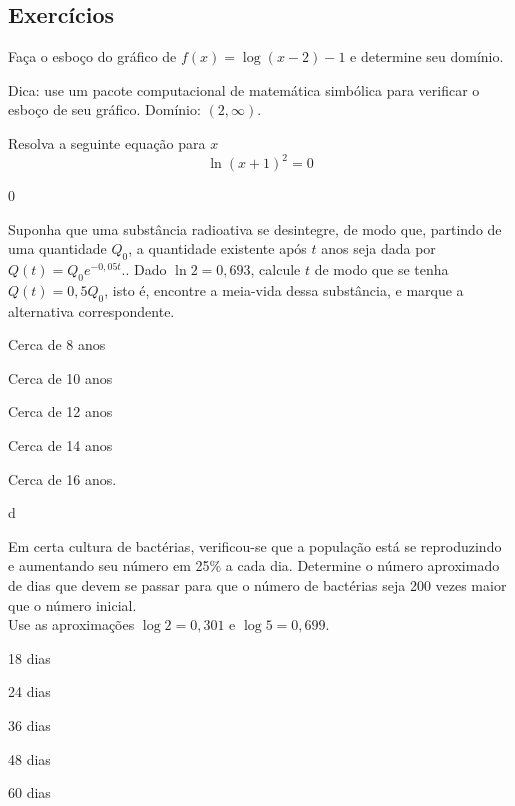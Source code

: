 \documentclass[../main.tex]{subfiles}
\begin{document}
\subsection{Exercícios}

\begin{exer}
  Faça o esboço do gráfico de $f(x) = \log(x-2)-1$ e determine seu domínio.
\end{exer}
\begin{resp}
  Dica: use um pacote computacional de matemática simbólica para verificar o esboço de seu gráfico. Domínio: $(2, \infty)$.
\end{resp}

\begin{exer}
  Resolva a seguinte equação para $x$
  \begin{equation*}
    \ln(x+1)^2=0
  \end{equation*}
\end{exer}
\begin{resp}
  $0$
\end{resp}
\begin{exer}
Suponha que uma substância radioativa se desintegre, de modo que, partindo de uma quantidade $Q_0$, a quantidade existente após $t$ anos seja dada por $Q(t) = Q_0 e^{-0,05t}$.. Dado $\ln 2 = 0,693$, calcule $t$ de modo que se tenha $Q(t) = 0,5 Q_0$, isto é, encontre a meia-vida dessa substância, e marque a alternativa correspondente.
\begin{multicols}{3}
\begin{compactenum}[a)]
\item  Cerca de 8 anos\item  Cerca de 10 anos\item Cerca de 12 anos\item Cerca de 14 anos\item Cerca de 16 anos.
\end{compactenum}
\end{multicols}
\end{exer}
\begin{resp}
d
\end{resp}
\begin{exer}
Em certa cultura de bactérias, verificou-se que a população está se reproduzindo e aumentando seu número em 25\% a cada dia. Determine o número aproximado de dias que devem se passar para que o número de bactérias seja 200 vezes maior que o número inicial.\\
Use as aproximações $\log 2 = 0,301$ e $\log 5 = 0,699$.
\begin{multicols}{3}
\begin{compactenum}[a)]
\item 18 dias\item 24 dias\item  36 dias\item  48 dias\item  60 dias
\end{compactenum}
\end{multicols}
\end{exer}
\end{document}
